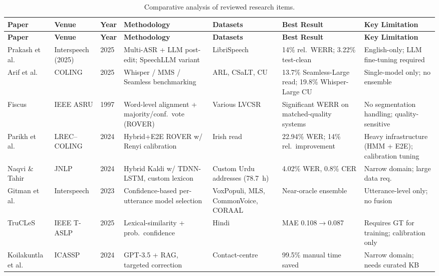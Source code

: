 \begin{landscape}
\renewcommand{\arraystretch}{1.4}
\small
\begin{longtable}{p{3.3cm}p{2.8cm}p{1.2cm}p{3.4cm}p{3.4cm}p{2.8cm}p{2.8cm}}
\caption{Comparative analysis of reviewed research items.}\label{tab:lit-comparative} \\
\toprule
\textbf{Paper} & \textbf{Venue} & \textbf{Year} & \textbf{Methodology} & \textbf{Datasets} & \textbf{Best Result} & \textbf{Key Limitation}\\
\midrule
\endfirsthead
\toprule
\textbf{Paper} & \textbf{Venue} & \textbf{Year} & \textbf{Methodology} & \textbf{Datasets} & \textbf{Best Result} & \textbf{Key Limitation}\\
\midrule
\endhead
Prakash et al.\ \cite{prakash2025multi} & Interspeech (2025) & 2025 & Multi-ASR + LLM post-edit; SpeechLLM variant & LibriSpeech & 14\% rel.\ WERR; 3.22\% test-clean & English-only; LLM fine-tuning required \\
Arif et al.\ \cite{arif2024wer} & COLING & 2025 & Whisper / MMS / Seamless benchmarking & ARL, CSaLT, CU & 13.7\% Seamless-Large read; 19.8\% Whisper-Large CU & Single-model only; no ensemble \\
Fiscus \cite{fiscus1997rover} & IEEE ASRU & 1997 & Word-level alignment + majority/conf.\ vote (ROVER) & Various LVCSR & Significant WERR on matched-quality systems & No segmentation handling; quality-sensitive \\
Parikh et al.\ \cite{parikh2024hybrid} & LREC--COLING & 2024 & Hybrid+E2E ROVER w/ Renyi calibration & Irish read & 22.94\% WER; 14\% rel.\ improvement & Heavy infrastructure (HMM + E2E); calibration tuning \\
Naqvi \& Tahir \cite{naqvi2024code} & JNLP & 2024 & Hybrid Kaldi w/ TDNN-LSTM, custom lexicon & Custom Urdu addresses (78.7~h) & 4.02\% WER, 0.8\% CER & Narrow domain; large data req. \\
Gitman et al.\ \cite{gitman2023confidence} & Interspeech & 2023 & Confidence-based per-utterance model selection & VoxPopuli, MLS, CommonVoice, CORAAL & Near-oracle ensemble & Utterance-level only; no fusion \\
TruCLeS \cite{trucles2025} & IEEE T-ASLP & 2025 & Lexical-similarity + prob.\ confidence & Hindi & MAE 0.108$\to$0.087 & Requires GT for training; calibration only \\
Koilakuntla et al.\ \cite{koilakuntla2024llm} & ICASSP & 2024 & GPT-3.5 + RAG, targeted correction & Contact-centre & 99.5\% manual time saved & Narrow domain; needs curated KB \\

\end{longtable}
\end{landscape}
